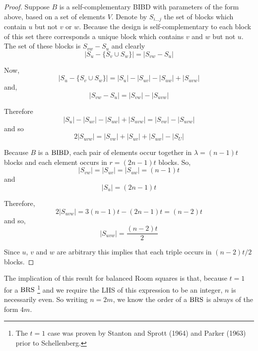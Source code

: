 \begin{proof}
Suppose $B$ is a self-complementary BIBD with parameters of the form above, based on a set of elements $V$.
Denote by $S_{i\ldots j}$ the set of blocks which contain $u$ but not $v$ or $w$.
Because the design is self-complementary to each block of this set there corresponds a unique block which contains $v$ and $w$ but not $u$.
The set of these blocks is $S_{vw} - S_u$ and clearly
\begin{equation}
|S_u - \{S_v \cup S_w\}| = |S_{vw} - S_u|
\end{equation}

Now,
\begin{equation}
|S_u-\{S_v \cup S_w\}| = |S_u| - |S_{uv}| -|S_{uw}| + |S_{uvw}|
\end{equation}
and,
\begin{equation}
|S_{vw} - S_u| = |S_{vw}| - |S_{uvw}|
\end{equation}

Therefore
\begin{equation}
|S_u| - |S_{uv}| -|S_{uw}| + |S_{uvw}| = |S_{vw}| - |S_{uvw}|
\end{equation}
and so
\begin{equation}
2|S_{uvw}| = |S_{vw}| + |S_{uv}| + |S_{uw}| - |S_{U}|
\end{equation}

Because $B$ is a $\operatorname{BIBD}$, each pair of elements occur together in $\lambda = (n - 1)t$ blocks and each element occurs in $r = (2n - 1)t$ blocks.
So,
\begin{equation}
|S_{vw}| = |S_{uv}| = |S_{uw}| = (n - 1)t
\end{equation}
and
\begin{equation}
|S_u| = (2n - 1)t
\end{equation}

Therefore,
\begin{equation}
2|S_{uvw}| = 3(n - 1)t - (2n  -1)t = (n - 2)t
\end{equation}
and so,
\begin{equation}
|S_{uvw}| = \frac{(n - 2)t}{2}
\end{equation}

Since $u$, $v$ and $w$ are arbitrary this implies that each triple occurs in $(n - 2)t/2$ blocks.
\end{proof}

The implication of this result for balanced Room squares is that, because $t = 1$ for a $\operatorname{BRS}$ \footnote{The $t=1$ case was proven by Stanton and Sprott (1964) and Parker (1963) prior to Schellenberg.} and we require the LHS of this expression to be an integer, $n$ is necessarily even.
So writing $n = 2m$, we know the order of a $\operatorname{BRS}$ is always of the form $4m$.

